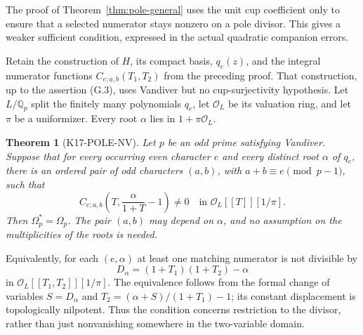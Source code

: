 \documentclass[11pt,a4paper]{article}
\newtheorem{theorem}{Theorem}[section]
\theoremstyle{definition}
\begin{document}
The proof of Theorem~\ref{thm:pole-general} uses the unit cup coefficient only to ensure that a selected numerator stays nonzero on a pole divisor. This gives a weaker sufficient condition, expressed in the actual quadratic companion errors.

Retain the construction of $H$, its compact basis, $q_e(z)$, and the integral numerator functions $C_{e;a,b}(T_1,T_2)$ from the preceding proof. That construction, up to the assertion (G.3), uses Vandiver but no cup-surjectivity hypothesis. Let $L/\mathbb Q_p$ split the finitely many polynomials $q_e$, let $\mathcal O_L$ be its valuation ring, and let $\pi$ be a uniformizer. Every root $\alpha$ lies in $1+\pi\mathcal O_L$.

\begin{theorem}[K17-POLE-NV]\label{thm:pole-nv}
Let $p$ be an odd prime satisfying Vandiver. Suppose that for every occurring even character $e$ and every distinct root $\alpha$ of $q_e$, there is an ordered pair of odd characters $(a,b)$, with $a+b\equiv e\pmod{p-1}$, such that
\[
 C_{e;a,b}\!\left(T,\frac{\alpha}{1+T}-1\right)\ne0
 \quad\text{in }\mathcal O_L[[T]][1/\pi].                    \tag{NV}
\]
Then $\Omega_p^*=\Omega_p$. The pair $(a,b)$ may depend on $\alpha$, and no assumption on the multiplicities of the roots is needed.
\end{theorem}

Equivalently, for each $(e,\alpha)$ at least one matching numerator is not divisible by
\[
 D_\alpha=(1+T_1)(1+T_2)-\alpha
\]
in $\mathcal O_L[[T_1,T_2]][1/\pi]$. The equivalence follows from the formal change of variables $S=D_\alpha$ and $T_2=(\alpha+S)/(1+T_1)-1$; its constant displacement is topologically nilpotent. Thus the condition concerns restriction to the divisor, rather than just nonvanishing somewhere in the two-variable domain.
\end{document}
